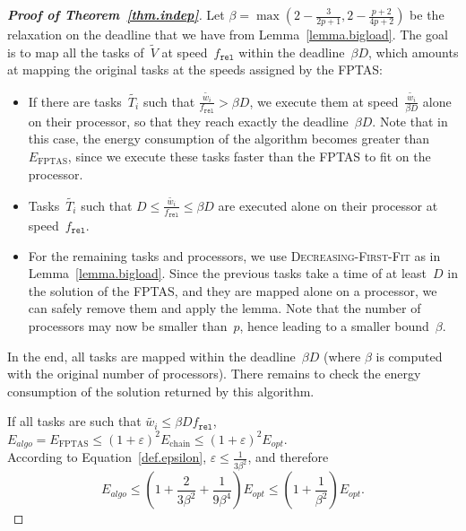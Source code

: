 \documentclass[a4paper]{article}
\theoremstyle{plain}
\theoremstyle{definition}
\theoremstyle{remark}
\newcommand{\fr}{\ensuremath{f_{\texttt{rel}}}\xspace}
\newcommand{\dff}{\textsc{Dec\-reasing-First-Fit}\xspace}
\begin{document}
\begin{proof}[{\bf Proof of Theorem~\ref{thm.indep}}]
Let $\beta= \max ( 2-\frac{3}{2p+1}, 2 -\frac{p+2}{4p+2} )$ be the
relaxation on the deadline that we have from
Lemma~\ref{lemma.bigload}. The goal is to map all the tasks
of~$\tilde{V}$ at speed~\fr within the deadline~$\beta D$, which
amounts at mapping the original tasks at the speeds assigned by the
FPTAS: \begin{itemize}
\item If there are tasks~$\tilde{T_i}$ such that $\frac{\tilde{w_i}}{\fr} >
\beta D$, we execute them at speed~$\frac{\tilde{w_i}}{\beta D}$ alone
on their processor, so that they reach exactly the deadline~$\beta
D$. Note that in this case, the energy consumption of the algorithm
becomes greater than $E_{\text{FPTAS}}$, since we execute these tasks
faster than the FPTAS to fit on the processor. 
\item Tasks~$\tilde{T_i}$ such that $D \leq \frac{\tilde{w_i}}{\fr}
  \leq \beta D$ are executed alone on their processor at speed~\fr. 
\item For the remaining tasks and processors, we use \dff as in
  Lemma~\ref{lemma.bigload}. Since the previous tasks take a time of
  at least~$D$ in the solution of the FPTAS, and they are mapped alone
  on a processor, we can safely remove them and apply the lemma. Note
  that the number of processors may now be smaller than~$p$, hence
  leading to a smaller bound~$\beta$.
\end{itemize}





In the end, all tasks are mapped within the deadline~$\beta D$ (where
$\beta$ is computed with the original number of processors). There
remains to check the energy consumption of the solution returned by
this algorithm. 

\medskip
If all tasks are such that $\tilde{w_i} \leq \beta D\fr$, 
$E_{algo}=E_{\text{FPTAS}} \leq \left( 1 + 
  \varepsilon \right)^2 E_{\text{chain}} \leq \left( 1 +
  \varepsilon \right)^2 E_{opt}$. \\
According to Equation~\eqref{def.epsilon}, $\varepsilon \leq
\frac{1}{3\beta^2}$, and therefore 
$$E_{algo} \leq \left(1 + \frac{2}{3\beta^2} +
  \frac{1}{9\beta^4}\right) E_{opt} \leq
\left(1+\frac{1}{\beta^2}\right)E_{opt}.$$




\end{proof}
\end{document}
